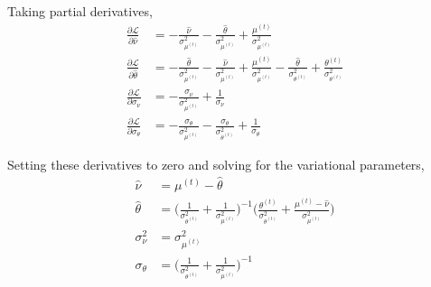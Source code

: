 \documentclass[10pt]{article}
\theoremstyle{plain}
\theoremstyle{definition}
\newcommand{\<}{\langle}
\renewcommand{\>}{\rangle}
\begin{document}
Taking partial derivatives, 
\begin{align}
\frac{\partial \mathcal L}{\partial \hat\nu} &= - \frac{\hat \nu}{\sigma^2_{\mu^{(t)}}} - \frac{\hat \theta}{\sigma^2_{\mu^{(t)}}} +  \frac{\mu^{(t)}}{\sigma^2_{\mu^{(t)}}} \\
\frac{\partial \mathcal L}{\partial \hat\theta} 	&=  - \frac{\hat \theta}{\sigma^2_{\mu^{(t)}}} - \frac{\hat \nu}{\sigma^2_{\mu^{(t)}}} +  \frac{\mu^{(t)}}{\sigma^2_{\mu^{(t)}}} - \frac{\hat\theta}{\sigma^2_{\theta^{(t)}}} + \frac{\theta^{(t)}}{\sigma^2_{\theta^{(t)}}}\\
\frac{\partial \mathcal L}{\partial \sigma_\nu} &= - \frac{\sigma_\nu}{\sigma^2_{\mu^{(t)}}} + \frac{1}{\sigma_\nu}\\
\frac{\partial \mathcal L}{\partial \sigma_\theta} &= - \frac{\sigma_\theta} {\sigma^2_{\mu^{(t)}}} - \frac{\sigma_\theta}{\sigma_{\theta^{(t)}}^2}+ \frac{1}{\sigma_\theta}
\end{align}

Setting these derivatives to zero and solving for the variational parameters, 
\begin{align}
\hat \nu &= \mu^{(t)} - \hat\theta\\
\hat \theta &= \Big(\frac{1}{\sigma^2_{\theta^{(t)}}}  + \frac{1}{\sigma^2_{\mu^{(t)}} }\Big)^{-1}\Big(\frac{\theta^{(t)}}{\sigma^2_{\theta^{(t)}}} + \frac{\mu^{(t)}  - \hat\nu}{\sigma^2_{\mu^{(t)}}}\Big)\\
\sigma_\nu^2 &= \sigma^2_{\mu^{(t)}}\\
\sigma_\theta &= \Big(\frac{1}{\sigma^2_{\theta^{(t)}}}  + \frac{1}{\sigma^2_{\mu^{(t)}} }\Big)^{-1}
\end{align}
\end{document}
